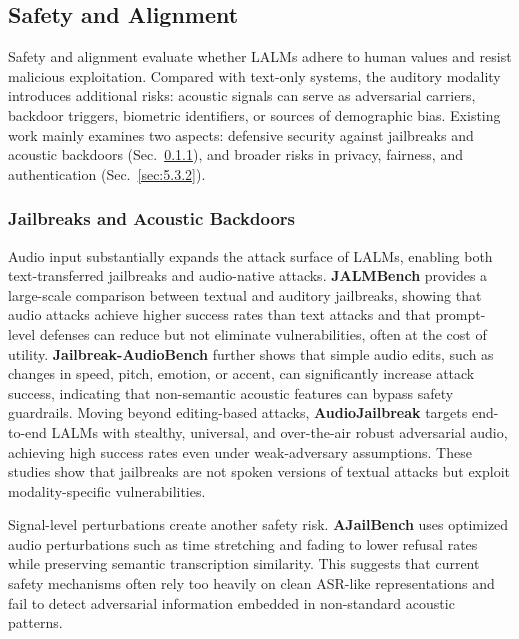 \documentclass{llmxive}
\begin{document}
\subsection{Safety and Alignment}
\label{sec:5.3}

Safety and alignment evaluate whether LALMs adhere to human values and resist malicious exploitation. Compared with text-only systems, the auditory modality introduces additional risks: acoustic signals can serve as adversarial carriers, backdoor triggers, biometric identifiers, or sources of demographic bias. Existing work mainly examines two aspects: defensive security against jailbreaks and acoustic backdoors (Sec.~\ref{sec:5.3.1}), and broader risks in privacy, fairness, and authentication (Sec.~\ref{sec:5.3.2}).

\subsubsection{Jailbreaks and Acoustic Backdoors}
\label{sec:5.3.1}

Audio input substantially expands the attack surface of LALMs, enabling both text-transferred jailbreaks and audio-native attacks. \textbf{JALMBench} \cite{peng2025jalmbench} provides a large-scale comparison between textual and auditory jailbreaks, showing that audio attacks achieve higher success rates than text attacks and that prompt-level defenses can reduce but not eliminate vulnerabilities, often at the cost of utility. \textbf{Jailbreak-AudioBench} \cite{cheng2025jailbreak} further shows that simple audio edits, such as changes in speed, pitch, emotion, or accent, can significantly increase attack success, indicating that non-semantic acoustic features can bypass safety guardrails. Moving beyond editing-based attacks, \textbf{AudioJailbreak} \cite{chen2025audiojailbreak} targets end-to-end LALMs with stealthy, universal, and over-the-air robust adversarial audio, achieving high success rates even under weak-adversary assumptions. These studies show that jailbreaks are not spoken versions of textual attacks but exploit modality-specific vulnerabilities.

Signal-level perturbations create another safety risk. \textbf{AJailBench} \cite{song2025audio} uses optimized audio perturbations such as time stretching and fading to lower refusal rates while preserving semantic transcription similarity. This suggests that current safety mechanisms often rely too heavily on clean ASR-like representations and fail to detect adversarial information embedded in non-standard acoustic patterns.
\end{document}
